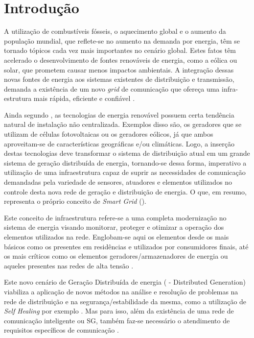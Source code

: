 \chapter{Introdução}
A utilização de combustíveis fósseis, o aquecimento global e o aumento da população mundial, que reflete-se no aumento na demanda por energia, têm se tornado tópicos cada vez mais importantes no cenário global. Estes fatos têm acelerado o desenvolvimento de fontes renováveis de energia, como a eólica ou solar, que prometem causar menos impactos ambientais. A integração dessas novas fontes de energia aos sistemas existentes de distribuição e transmissão, demanda a existência de um novo \emph{grid} de comunicação que ofereça uma infra-estrutura mais rápida, eficiente e confiável \cite{Art-Gungor2013}.

Ainda segundo \cite{Art-Gungor2013}, as tecnologias de energia renovável possuem certa tendência natural de instalação não centralizada. Exemplos disso são, os geradores que se utilizam de células fotovoltaicas ou os geradores eólicos, já que ambos aproveitam-se de características geográficas e/ou climáticas. Logo, a inserção destas tecnologias deve transformar o sistema de distribuição atual em um grande sistema de geração distribuída de energia, tornando-se dessa forma, imperativo a utilização de uma infraestrutura capaz de suprir as necessidades de comunicação demandadas pela variedade de sensores, atuadores e elementos utilizados no controle desta nova rede de geração e distribuição de energia. O que, em resumo, representa o próprio conceito de \emph{Smart Grid} ().

Este conceito de infraestrutura refere-se a uma completa modernização no sistema de energia visando monitorar, proteger e otimizar a operação dos elementos utilizados na rede. Englobam-se aqui os elementos desde os mais básicos como os presentes em residências e utilizados por consumidores finais, até os mais críticos como os elementos geradores/armazenadores de energia ou aqueles presentes nas redes de alta tensão \cite{Conf-Sood2009}.

Este novo cenário de Geração Distribuída de energia ( - Distributed Generation) viabiliza a aplicação de novos métodos na análise e resolução de problemas na rede de distribuição e na segurança/estabilidade da mesma, como a utilização de \emph{Self Healing} por exemplo \cite{Art-Amin2006}. Mas para isso, além da existência de uma rede de comunicação inteligente ou SG, também faz-se necessário o atendimento de requisitos específicos de comunicação \cite{Conf-Sood2009}.

